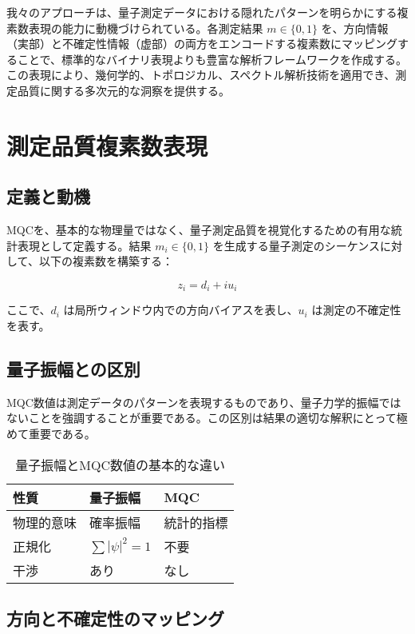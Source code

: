 \documentclass[a4paper,11pt]{article}
\begin{document}
\begin{CJK}{UTF8}{min}
我々のアプローチは、量子測定データにおける隠れたパターンを明らかにする複素数表現の能力に動機づけられている。各測定結果 $m \in \{0, 1\}$ を、方向情報（実部）と不確定性情報（虚部）の両方をエンコードする複素数にマッピングすることで、標準的なバイナリ表現よりも豊富な解析フレームワークを作成する。この表現により、幾何学的、トポロジカル、スペクトル解析技術を適用でき、測定品質に関する多次元的な洞察を提供する。

\section{測定品質複素数表現}

\subsection{定義と動機}

MQCを、基本的な物理量ではなく、量子測定品質を視覚化するための有用な統計表現として定義する。結果 $m_i \in \{0, 1\}$ を生成する量子測定のシーケンスに対して、以下の複素数を構築する：

\begin{equation}
z_i = d_i + i u_i
\label{eq:cqt_basic}
\end{equation}

ここで、$d_i$ は局所ウィンドウ内での方向バイアスを表し、$u_i$ は測定の不確定性を表す。

\subsection{量子振幅との区別}

MQC数値は測定データのパターンを表現するものであり、量子力学的振幅ではないことを強調することが重要である。この区別は結果の適切な解釈にとって極めて重要である。

\begin{table}[h]
\centering
\caption{量子振幅とMQC数値の基本的な違い}
\begin{tabular}{lll}
\hline
性質 & 量子振幅 & MQC \\
\hline
物理的意味 & 確率振幅 & 統計的指標 \\
正規化 & $\sum|\psi|^2 = 1$ & 不要 \\
干渉 & あり & なし \\
\hline
\end{tabular}
\end{table}

\subsection{方向と不確定性のマッピング}


\end{CJK}
\end{document}
